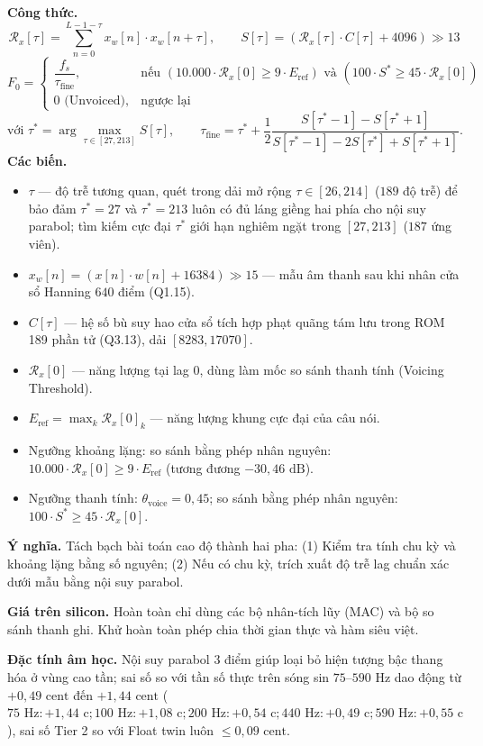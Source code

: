 \documentclass[11pt,a4paper]{article}
\begin{document}
\begin{equationcard}
\textbf{Công thức.}
\[
\mathcal{R}_x[\tau] = \sum_{n=0}^{L - 1 - \tau} x_w[n] \cdot x_w[n+\tau], \qquad S[\tau] = (\mathcal{R}_x[\tau] \cdot C[\tau] + 4096) \gg 13
\]
\[
F_0 = \begin{cases} 
\dfrac{f_s}{\tau_{\text{fine}}}, & \text{nếu } (10.000 \cdot \mathcal{R}_x[0] \ge 9 \cdot E_{\text{ref}}) \text{ và } (100 \cdot S^* \ge 45 \cdot \mathcal{R}_x[0]) \\[3mm] 
0\text{ (Unvoiced)}, & \text{ngược lại} 
\end{cases}
\]
\vspace{-2mm}
\[
\text{với } \tau^* = \arg\max_{\tau \in [27, 213]} S[\tau], \qquad \tau_{\text{fine}} = \tau^* + \frac{1}{2} \frac{S[\tau^*-1] - S[\tau^*+1]}{S[\tau^*-1] - 2S[\tau^*] + S[\tau^*+1]}.
\]
\textbf{Các biến.}
\begin{itemize}\setlength{\itemsep}{0.5pt}
    \item $\tau$ --- độ trễ tương quan, quét trong dải mở rộng $\tau \in [26, 214]$ ($189$ độ trễ) để bảo đảm $\tau^* = 27$ và $\tau^* = 213$ luôn có đủ láng giềng hai phía cho nội suy parabol; tìm kiếm cực đại $\tau^*$ giới hạn nghiêm ngặt trong $[27, 213]$ ($187$ ứng viên).
    \item $x_w[n] = (x[n] \cdot w[n] + 16384) \gg 15$ --- mẫu âm thanh sau khi nhân cửa sổ Hanning $640$ điểm (Q1.15).
    \item $C[\tau]$ --- hệ số bù suy hao cửa sổ tích hợp phạt quãng tám lưu trong ROM 189 phần tử (Q3.13), dải $[8283, 17070]$.
    \item $\mathcal{R}_x[0]$ --- năng lượng tại lag 0, dùng làm mốc so sánh thanh tính (Voicing Threshold).
    \item $E_{\text{ref}} = \max_k \mathcal{R}_x[0]_k$ --- năng lượng khung cực đại của câu nói.
    \item Ngưỡng khoảng lặng: so sánh bằng phép nhân nguyên: $10.000 \cdot \mathcal{R}_x[0] \ge 9 \cdot E_{\text{ref}}$ (tương đương $-30{,}46\text{ dB}$).
    \item Ngưỡng thanh tính: $\theta_{\text{voice}} = 0{,}45$; so sánh bằng phép nhân nguyên: $100 \cdot S^* \ge 45 \cdot \mathcal{R}_x[0]$.
\end{itemize}
\textbf{Ý nghĩa.} Tách bạch bài toán cao độ thành hai pha: (1) Kiểm tra tính chu kỳ và khoảng lặng bằng số nguyên; (2) Nếu có chu kỳ, trích xuất độ trễ lag chuẩn xác dưới mẫu bằng nội suy parabol.

\textbf{Giá trên silicon.} Hoàn toàn chỉ dùng các bộ nhân-tích lũy (MAC) và bộ so sánh thanh ghi. Khử hoàn toàn phép chia thời gian thực và hàm siêu việt.

\textbf{Đặc tính âm học.} Nội suy parabol 3 điểm giúp loại bỏ hiện tượng bậc thang hóa ở vùng cao tần; sai số so với tần số thực trên sóng sin $75\text{--}590\text{ Hz}$ dao động từ $+0{,}49\text{ cent}$ đến $+1{,}44\text{ cent}$ ($75\text{ Hz}: +1{,}44\text{ c}; 100\text{ Hz}: +1{,}08\text{ c}; 200\text{ Hz}: +0{,}54\text{ c}; 440\text{ Hz}: +0{,}49\text{ c}; 590\text{ Hz}: +0{,}55\text{ c}$), sai số Tier 2 so với Float twin luôn $\le 0{,}09\text{ cent}$.
\end{equationcard}
\end{document}
